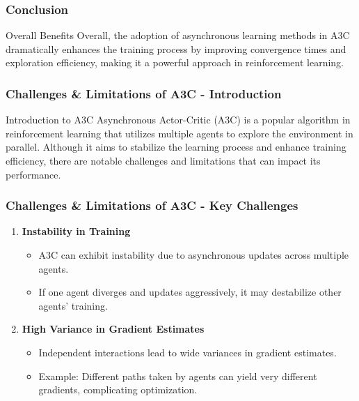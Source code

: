 \documentclass{beamer}
\begin{document}
\begin{frame}[fragile]
    \frametitle{Conclusion}
    \begin{block}{Overall Benefits}
        Overall, the adoption of asynchronous learning methods in A3C dramatically enhances the training process by improving convergence times and exploration efficiency, making it a powerful approach in reinforcement learning.
    \end{block}
\end{frame}

\begin{frame}[fragile]
    \frametitle{Challenges \& Limitations of A3C - Introduction}
    \begin{block}{Introduction to A3C}
        Asynchronous Actor-Critic (A3C) is a popular algorithm in reinforcement learning that utilizes multiple agents to explore the environment in parallel. 
        Although it aims to stabilize the learning process and enhance training efficiency, there are notable challenges and limitations that can impact its performance.
    \end{block}
\end{frame}

\begin{frame}[fragile]
    \frametitle{Challenges \& Limitations of A3C - Key Challenges}
    \begin{enumerate}
        \item \textbf{Instability in Training}
            \begin{itemize}
                \item A3C can exhibit instability due to asynchronous updates across multiple agents.
                \item If one agent diverges and updates aggressively, it may destabilize other agents' training.
            \end{itemize}
        
        \item \textbf{High Variance in Gradient Estimates}
            \begin{itemize}
                \item Independent interactions lead to wide variances in gradient estimates.
                \item Example: Different paths taken by agents can yield very different gradients, complicating optimization.
            \end{itemize}
    \end{enumerate}
\end{frame}
\end{document}
